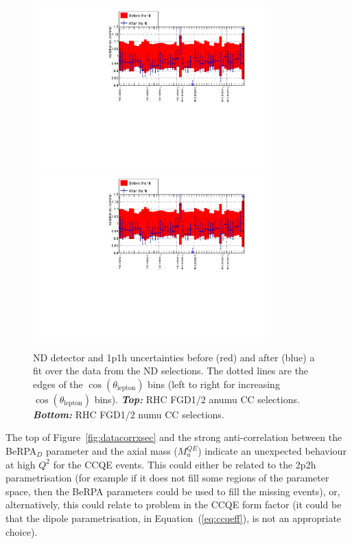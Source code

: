\begin{figure}[ht]
  \begin{center}
    \includegraphics[width=0.8\textwidth,page=6]{images/BANFF/OutputData_histos.pdf}\\
    \includegraphics[width=0.8\textwidth,page=7]{images/BANFF/OutputData_histos.pdf}
    \caption[ND280 detector and 1p1h uncertainties before and after a
    fit over the data from the RHC (anti-)$\nu_\mu$ and
    (anti-)$\nu_e$ND280 selections]{\Gls{ND} detector and 1p1h
      uncertainties before (red) and after (blue) a fit over the data
      from the \Gls{ND} selections. The dotted lines are the edges of
      the $\cos(\theta_\text{lepton})$ bins (left to right for
      increasing $\cos(\theta_\text{lepton})$
      bins). \textbf{\textit{Top:}} \Gls{RHC} \Gls{FGD}1/2 \Gls{anumu}
      \Gls{CC} selections.  \textbf{\textit{Bottom:}} \Gls{RHC}
      \Gls{FGD}1/2 \Gls{numu} \Gls{CC} selections.}
    \label{fig:datadet2}
  \end{center}
\end{figure}
\clearpage

The top of Figure~\ref{fig:datacorrxsec} and the strong
anti-correlation between the \Gls{BeRPA}$_D$ parameter and the axial
mass ($M_a^{QE}$) indicate an unexpected behaviour at high $Q^2$ for
the \Gls{CCQE} events. This could either be related to the \Gls{2p2h}
parametrisation (for example if it does not fill some regions of the
parameter space, then the \Gls{BeRPA} parameters could be used to fill
the missing events), or, alternatively, this could relate to problem
in the \Gls{CCQE} form factor (it could be that the dipole
parametrisation, in Equation~(\ref{eq:ccqeff}), is not an appropriate
choice).

